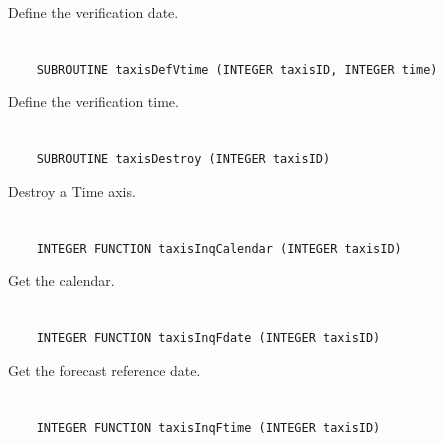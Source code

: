 Define the verification date.


\section*{\tt {}}

\begin{verbatim}
    SUBROUTINE taxisDefVtime (INTEGER taxisID, INTEGER time)
\end{verbatim}

Define the verification time.


\section*{\tt {}}

\begin{verbatim}
    SUBROUTINE taxisDestroy (INTEGER taxisID)
\end{verbatim}

Destroy a Time axis.


\section*{\tt {}}

\begin{verbatim}
    INTEGER FUNCTION taxisInqCalendar (INTEGER taxisID)
\end{verbatim}

Get the calendar.


\section*{\tt {}}

\begin{verbatim}
    INTEGER FUNCTION taxisInqFdate (INTEGER taxisID)
\end{verbatim}

Get the forecast reference date.


\section*{\tt {}}

\begin{verbatim}
    INTEGER FUNCTION taxisInqFtime (INTEGER taxisID)
\end{verbatim}

